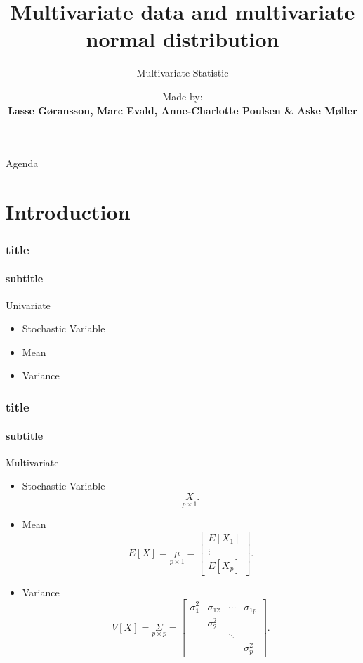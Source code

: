 \documentclass[aspectratio=169,10pt,t]{beamer}
\title{Multivariate data and multivariate normal distribution}
\subtitle{Multivariate Statistic}
\date{ }
\author{
	Made by: \\
	\textbf{Lasse Gøransson, Marc Evald, Anne-Charlotte Poulsen \& Aske Møller}
}
\institute[
  SDU Robotics\\
  The Maersk Mc-Kinney Moller Institute\\
  University of Southern Denmark
] %
{%
  SDU Robotics\\
  The Maersk Mc-Kinney Moller Institute\\
  University of Southern Denmark

}
\begin{document}
{\SDUwavesbg%
\begin{frame} %
  \titlepage
\end{frame}}

\begin{frame}{Agenda}{\vphantom{(y}}
\tableofcontents
\end{frame}

\section{Introduction}

\begin{frame}[t]
	\frametitle{title}
	\framesubtitle{subtitle}

	Univariate\\

	\begin{itemize}
		\item Stochastic Variable
		\item Mean
		\item Variance
	\end{itemize}
	
\end{frame}

\begin{frame}[t]
	\frametitle{title}
	\framesubtitle{subtitle}

	Multivariate

	\begin{itemize}
		\item Stochastic Variable
			\[
			\underset{p\times 1}{X}
			.\] 
		\item Mean
			\[
				E \left[ X \right] =
				\underset{p\times 1}{\mu} =
				\begin{bmatrix}
					E \left[ X_1  \right] \\
					\vdots\\
					E \left[ X_p  \right] 
				\end{bmatrix}
			.\] 
		\item Variance
			\[
				V \left[ X  \right]  =
				\underset{p\times p}{\Sigma}
				=
				\begin{bmatrix}
					\sigma_1^{2} & \sigma_{12} & \cdots & \sigma_{1p}\\
					 & \sigma_2^{2} & &\\
								 & & \ddots &\\
								&&& \sigma_{p}^{2}
				\end{bmatrix}
			.\] 
	\end{itemize}
\end{frame}
\end{document}
